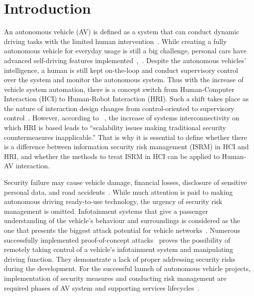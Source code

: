 \documentclass[manuscript]{acmart}
\begin{document}




\maketitle

\section{Introduction}
An autonomous vehicle (AV) is defined as a system that can conduct dynamic driving tasks with the limited human intervention~\cite{sae2016taxonomy}. While creating a fully autonomous vehicle for everyday usage is still a big challenge, personal cars have advanced self-driving features implemented~\cite{SMofAS_Survey},~\cite{hagenziekerautomated}. 
Despite the autonomous vehicles' intelligence, a human is still kept on-the-loop and conduct supervisory control over the system and monitor the autonomous system. Thus with the increase of vehicle system automation, there is a concept switch from Human-Computer Interaction (HCI) to Human-Robot Interaction (HRI). Such a shift takes place as the nature of interaction design changes from control-oriented to supervisory control~\cite{HMIvsHRI}. However, according to~\cite{HCI_grandChal}%
, the increase of  systems interconnectivity on which HRI is based leads to ``scalability issues making traditional security countermeasures inapplicable.'' That is why it is essential to define whether there is a difference between information security risk management (ISRM) in HCI and HRI, and whether the methods to treat ISRM in HCI can be applied to Human-AV interaction.

Security failure may cause vehicle damage, financial losses, disclosure of sensitive personal data, and road accidents~\cite{ENISA_SmartCars}. While much attention is paid to making autonomous driving ready-to-use technology, the urgency of security risk management is omitted. 
Infotainment systems that give a passenger understanding of the vehicle's behaviour and surroundings is considered as the one that presents the biggest attack potential for vehicle networks~\cite{hodge2019vehicle}. Numerous successfully implemented proof-of-concept attacks~\cite{ENISA_SmartCars} proves the possibility of remotely taking control of a vehicle's infotainment system and manipulating driving function. They demonstrate a lack of proper addressing security risks during the development. For the successful launch of autonomous vehicle projects, implementation of security measures and conducting risk management are required phases of AV system and supporting services lifecycles~\cite{ENISA_CAM2021}. 
\end{document}
